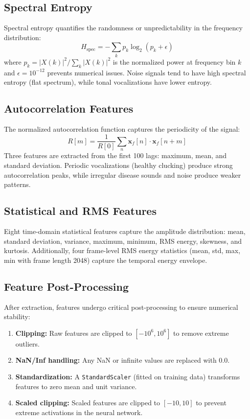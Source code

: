 \documentclass[12pt,a4paper]{report}
\begin{document}
\subsection{Spectral Entropy}

Spectral entropy quantifies the randomness or unpredictability in the frequency distribution:
\begin{equation}
    H_{\text{spec}} = -\sum_{k} p_k \log_2(p_k + \epsilon)
\label{eq:spectral_entropy}
\end{equation}
where $p_k = |X(k)|^2 / \sum_k |X(k)|^2$ is the normalized power at frequency bin $k$ and $\epsilon = 10^{-12}$ prevents numerical issues. Noise signals tend to have high spectral entropy (flat spectrum), while tonal vocalizations have lower entropy.

\subsection{Autocorrelation Features}

The normalized autocorrelation function captures the periodicity of the signal:
\begin{equation}
    R[m] = \frac{1}{R[0]} \sum_{n} \mathbf{x}_f[n] \cdot \mathbf{x}_f[n+m]
\end{equation}
Three features are extracted from the first 100 lags: maximum, mean, and standard deviation. Periodic vocalizations (healthy clucking) produce strong autocorrelation peaks, while irregular disease sounds and noise produce weaker patterns.

\subsection{Statistical and RMS Features}

Eight time-domain statistical features capture the amplitude distribution: mean, standard deviation, variance, maximum, minimum, RMS energy, skewness, and kurtosis. Additionally, four frame-level RMS energy statistics (mean, std, max, min with frame length 2048) capture the temporal energy envelope.

\subsection{Feature Post-Processing}

After extraction, features undergo critical post-processing to ensure numerical stability:
\begin{enumerate}
    \item \textbf{Clipping:} Raw features are clipped to $[-10^6, 10^6]$ to remove extreme outliers.
    \item \textbf{NaN/Inf handling:} Any NaN or infinite values are replaced with 0.0.
    \item \textbf{Standardization:} A \texttt{StandardScaler} (fitted on training data) transforms features to zero mean and unit variance.
    \item \textbf{Scaled clipping:} Scaled features are clipped to $[-10, 10]$ to prevent extreme activations in the neural network.
\end{enumerate}
\end{document}
